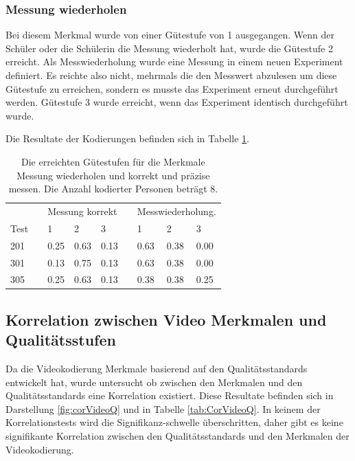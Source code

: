  \subsubsection{Messung wiederholen}
 
 Bei diesem Merkmal wurde von einer Gütestufe von 1 ausgegangen. Wenn der Schüler oder die Schülerin die Messung wiederholt hat, wurde die Gütestufe 2 erreicht. Als Messwiederholung wurde eine Messung in einem neuen Experiment definiert. Es reichte also nicht, mehrmals die den Messwert abzulesen um diese Gütestufe zu erreichen, sondern es musste das Experiment erneut durchgeführt werden. Gütestufe 3 wurde erreicht, wenn das Experiment identisch durchgeführt wurde.
 
 Die Resultate der Kodierungen befinden sich in Tabelle \ref{tab:VideoMerkmale}.
 
 
 
 \begin{table}[htbp]
   \centering
 \begin{tabular}{@{}lllllllll@{}}
 \toprule
    &&\multicolumn{3}{l}{Messung korrekt} &&  \multicolumn{3}{l}{Messwiederholung.}\\ 
       \cmidrule{3-5}\cmidrule{7-9}
    Test && 1 & 2 & 3 && 1 & 2 & 3 \\ 
 \midrule
    201 && 0.25 & 0.63 & 0.13 && 0.63 & 0.38 & 0.00   \\ 
    301 && 0.13 & 0.75 & 0.13 && 0.63 & 0.38 & 0.00   \\ 
    305 && 0.25 & 0.63 & 0.13 && 0.38 & 0.38 & 0.25\\ 
 
 \bottomrule
 \end{tabular} 
   \caption{Die erreichten Gütestufen für die Merkmale Messung wiederholen und korrekt und präzise messen. Die Anzahl kodierter Personen beträgt 8.  }
   \label{tab:VideoMerkmale}
 \end{table}
 

 
 \subsection{Korrelation zwischen Video Merkmalen und Qualitätsstufen}
 
 Da die Videokodierung Merkmale basierend auf den Qualitätsstandards entwickelt hat, wurde untersucht ob zwischen den Merkmalen und den Qualitätsstandards eine Korrelation existiert. Diese Resultate befinden sich in Darstellung \ref{fig:corVideoQ} und in Tabelle \ref{tab:CorVideoQ}. In keinem der Korrelationstests wird die Signifikanz-schwelle überschritten, daher gibt es keine signifikante Korrelation zwischen den Qualitätsstandards und den Merkmalen der Videokodierung.
 
